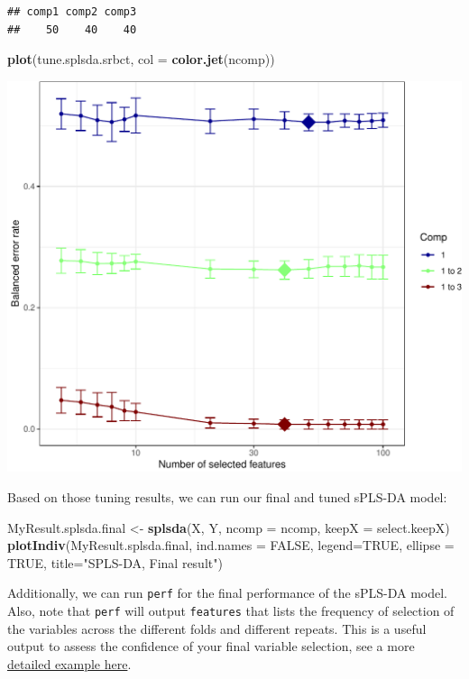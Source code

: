 \documentclass[]{book}
\newenvironment{Shaded}{\begin{snugshade}}{\end{snugshade}}
\newcommand{\DataTypeTok}[1]{\textcolor[rgb]{0.13,0.29,0.53}{#1}}
\newcommand{\KeywordTok}[1]{\textcolor[rgb]{0.13,0.29,0.53}{\textbf{#1}}}
\newcommand{\NormalTok}[1]{#1}
\newcommand{\OtherTok}[1]{\textcolor[rgb]{0.56,0.35,0.01}{#1}}
\newcommand{\StringTok}[1]{\textcolor[rgb]{0.31,0.60,0.02}{#1}}
\begin{document}
\begin{verbatim}
## comp1 comp2 comp3 
##    50    40    40
\end{verbatim}

\begin{Shaded}
\begin{Highlighting}[]
\KeywordTok{plot}\NormalTok{(tune.splsda.srbct, }\DataTypeTok{col =} \KeywordTok{color.jet}\NormalTok{(ncomp))}
\end{Highlighting}
\end{Shaded}

\begin{center}\includegraphics[width=0.5\linewidth]{Figures/04-tune-values-1} \end{center}

Based on those tuning results, we can run our final and tuned sPLS-DA model:

\begin{Shaded}
\begin{Highlighting}[]
\NormalTok{MyResult.splsda.final <-}\StringTok{ }\KeywordTok{splsda}\NormalTok{(X, Y, }\DataTypeTok{ncomp =}\NormalTok{ ncomp, }\DataTypeTok{keepX =}\NormalTok{ select.keepX)}
\KeywordTok{plotIndiv}\NormalTok{(MyResult.splsda.final, }\DataTypeTok{ind.names =} \OtherTok{FALSE}\NormalTok{, }\DataTypeTok{legend=}\OtherTok{TRUE}\NormalTok{,}
          \DataTypeTok{ellipse =} \OtherTok{TRUE}\NormalTok{, }\DataTypeTok{title=}\StringTok{"SPLS-DA, Final result"}\NormalTok{)}
\end{Highlighting}
\end{Shaded}

Additionally, we can run \texttt{perf} for the final performance of the sPLS-DA model. Also, note that \texttt{perf} will output \texttt{features} that lists the frequency of selection of the variables across the different folds and different repeats. This is a useful output to assess the confidence of your final variable selection, see a more \href{http://mixomics.org/case-studies/splsda-srbct/}{detailed example here}.
\end{document}
